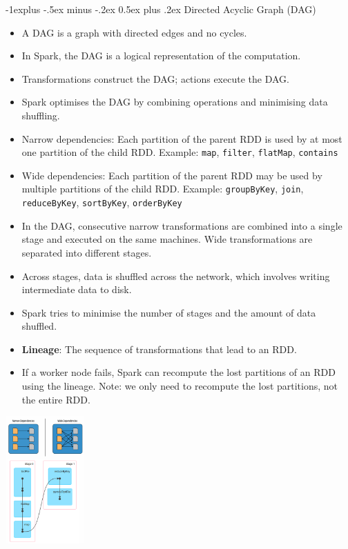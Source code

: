 \documentclass[10pt, landscape]{article}
\makeatletter
\renewcommand{\subsection}{\@startsection{subsection}{2}{0mm}%
  {-1explus -.5ex minus -.2ex}%
  {0.5ex plus .2ex}%
{\normalfont\normalsize\bfseries}}
\makeatother
\begin{document}
\begin{multicols*}{4}
  \subsection{Directed Acyclic Graph (DAG)}
  \begin{itemize}
    \item A DAG is a graph with directed edges and no cycles.
    \item In Spark, the DAG is a logical representation of the computation.
    \item Transformations construct the DAG; actions execute the DAG.
    \item Spark optimises the DAG by combining operations and minimising data shuffling.
    \item Narrow dependencies: Each partition of the parent RDD is used by at most one partition of the child RDD. Example: \texttt{map}, \texttt{filter}, \texttt{flatMap}, \texttt{contains}
    \item Wide dependencies: Each partition of the parent RDD may be used by multiple partitions of the child RDD. Example: \texttt{groupByKey}, \texttt{join}, \texttt{reduceByKey}, \texttt{sortByKey}, \texttt{orderByKey} 
    \item In the DAG, consecutive narrow transformations are combined into a single stage and executed on the same machines. Wide transformations are separated into different stages.
    \item Across stages, data is shuffled across the network, which involves writing intermediate data to disk.
    \item Spark tries to minimise the number of stages and the amount of data shuffled.
    \item \textbf{Lineage}: The sequence of transformations that lead to an RDD.
    \item If a worker node fails, Spark can recompute the lost partitions of an RDD using the lineage. Note: we only need to recompute the lost partitions, not the entire RDD.
  \end{itemize}

  \includegraphics[width=0.95\linewidth, height=185px]{spark_dependency_stages.png}


\end{multicols*}
\end{document}
